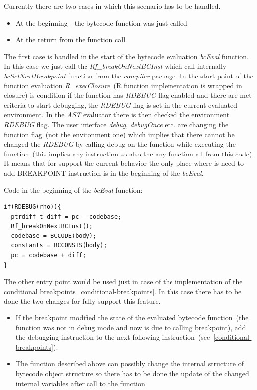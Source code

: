 \documentclass[thesis=M,english]{FITthesis}[2018/10/20]
\begin{document}
Currently there are two cases in which this scenario has to be handled.

\begin{itemize}
	\item At the beginning - the bytecode function was just called
	\item At the return from the function call
\end{itemize}

The first case is handled in the start of the bytecode evaluation \textit{bcEval} function. In this case we just call the \textit{Rf{\_}breakOnNextBCInst} which call internally \textit{bcSetNextBreakpoint} function from the \textit{compiler} package. In the start point of the function evaluation \textit{R{\_}execClosure}~(R function implementation is wrapped in closure) is condition if the function has \textit{RDEBUG} flag enabled and there are met criteria to start debugging, the \textit{RDEBUG} flag is set in the current evaluated environment. In the \textit{AST} evaluator there is then checked the environment \textit{RDEBUG} flag. The user interface \textit{debug}, \textit{debugOnce} etc. are changing the function flag~(not the environment one) which implies that there cannot be changed the \textit{RDEBUG} by calling debug on the function while executing the function~(this implies any instruction so also the any function all from this code). It means that for support the current behavior the only place where is need to add BREAKPOINT instruction is in the beginning of the \textit{bcEval}.

Code in the beginning of the \textit{bcEval} function:
\begin{lstlisting}
if(RDEBUG(rho)){
  ptrdiff_t diff = pc - codebase;
  Rf_breakOnNextBCInst();
  codebase = BCCODE(body);
  constants = BCCONSTS(body);
  pc = codebase + diff;
}
\end{lstlisting}

The other entry point would be used just in case of the implementation of the conditional breakpoints~\ref{conditional-breakpoints}. In this case there has to be done the two changes for fully support this feature.

\begin{itemize}
	\item If the breakpoint modified the state of the evaluated bytecode function~(the function was not in debug mode and now is due to calling breakpoint), add the debugging instruction to the next following instruction~(see~\ref{conditional-breakpoints}).
	\item The function described above can possibly change the internal structure of bytecode object structure so there has to be done the update of the changed internal variables after call to the function
\end{itemize}
\end{document}
